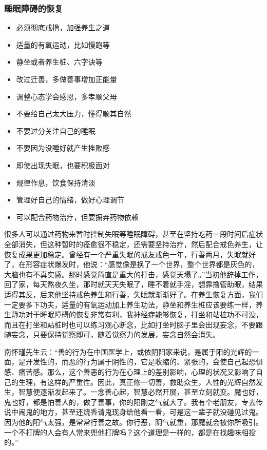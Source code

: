 \subsubsection{睡眠障碍的恢复}

\begin{itemize}
    \item 必须彻底戒撸，加强养生之道
    \item 适量的有氧运动，比如慢跑等
    \item 静坐或者养生桩、六字诀等
    \item 改过迁善，多做善事增加正能量
    \item 调整心态学会感恩，多孝顺父母
    \item 不要给自己太大压力，懂得顺其自然
    \item 不要过分关注自己的睡眠
    \item 不要因为没睡好就产生挫败感
    \item 即使出现失眠，也要积极面对
    \item 规律作息，饮食保持清淡
    \item 管理好自己的情绪，做好心理调节
    \item 可以配合药物治疗，但要摒弃药物依赖
\end{itemize}

很多人可以通过药物来暂时控制失眠等睡眠障碍，甚至在坚持吃药一段时间后症状全部消失，但这种暂时的痊愈很不稳定，还需要坚持治疗，然后配合戒色养生，让恢复成果更加稳定。曾经有一个严重失眠的戒友戒色一年，行善两月，失眠就好了，在形容症状爆发时，他说：“感觉像是换了一个世界，整个世界都是灰色的，大脑也有不真实感。那时感觉简直是重大的打击，感觉天塌了。”当初他辞掉工作，回了家，每天熬夜久坐，那时就天天失眠了，睡不着就手淫，想靠撸管助眠，结果适得其反，后来他坚持戒色养生和行善，失眠就渐渐好了。在养生恢复方面，我们一定要多下功夫，适量的有氧运动加上养生功法，静坐和养生桩应该要练一样，养生静功对于睡眠障碍的恢复非常有利，我神经症能够恢复，打坐和站桩功不可没，而且在打坐和站桩时也可以练习观心断念，比如打坐时脑子里会出现妄念，不要跟随妄念，只要保持觉察即可，随着觉察力的发展，妄念自然会消失。

南怀瑾先生云：“善的行为在中国医学上，或依阴阳家来说，是属于阳的光辉的一面，是开发性的，而恶的行为属于阴性的，它是收缩的、紧张的，会使自己起恐惧感、痛苦感。那么，这个善恶的行为在心理上的差别影响，心理的状况又影响了自己的生理，有这样的严重性。因此，真正修一切善，救助众生，人性的光辉自然发生，智慧便逐渐发起来了。一念善心起，智慧必然开展，甚至立刻就变。魔也好，鬼也好，都是怕善人的，做了善事，你的阳刚之气就大了。我有个老朋友，专去传说中闹鬼的地方，甚至还烧香请鬼现身给他看一看，可是这一辈子就没碰见过鬼。因为他的阳气太强，是常常行善之故。你行恶，阴气就重，那魔就会被你所吸引。一个不打牌的人会有人常来兜他打牌吗？这个道理是一样的，都是在找趣味相投的。”


